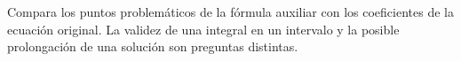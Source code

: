 Compara los puntos problemáticos de la fórmula auxiliar con los coeficientes de la ecuación original. La validez de una integral en un intervalo y la posible prolongación de una solución son preguntas distintas.

